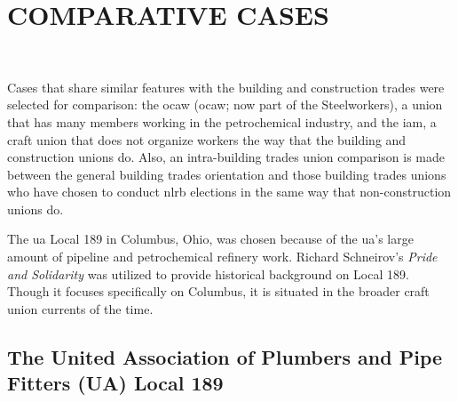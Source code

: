 \documentclass[12pt]{article}
\begin{document}
\section{COMPARATIVE CASES} \

Cases that share similar features with the building and construction trades were selected for comparison: the \acrlong{ocaw} (\acrshort{ocaw}; now part of the Steelworkers), a union that has many members working in the petrochemical industry, and the \acrfull{iam}, a craft union that does not organize workers the way that the building and construction unions do. Also, an intra-building trades union comparison is made between the general building trades orientation and those building trades unions who have chosen to conduct \acrshort{nlrb} elections in the same way that non-construction unions do.

The \acrfull{ua} Local 189 in Columbus, Ohio, was chosen because of the \acrshort{ua}'s large amount of pipeline and petrochemical refinery work. Richard Schneirov's \textit{Pride and Solidarity} was utilized to provide historical background on Local 189. Though it focuses specifically on Columbus, it is situated in the broader craft union currents of the time.

\subsection{The United Association of Plumbers and Pipe Fitters (UA) Local 189} \
\end{document}
